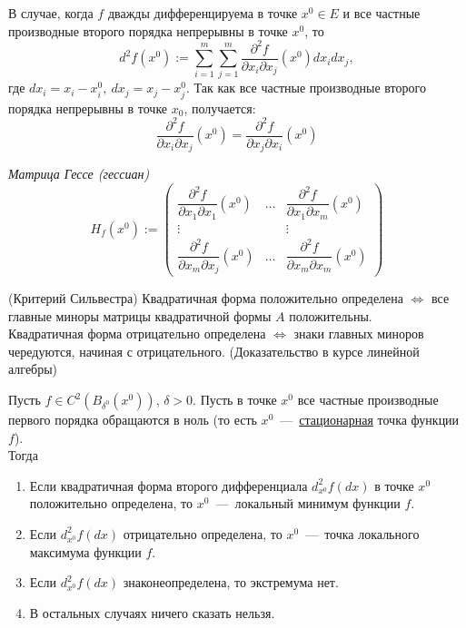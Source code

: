 В случае, когда $f$ дважды дифференцируема в точке $x^0 \in E$ и все частные производные второго порядка непрерывны в точке $x^0$, то 
$$ d^2f(x^0) := \sum\limits_{i=1}^m \sum\limits_{j=1}^m \dfrac{\partial^2 f}{\partial x_i \partial x_j} (x^0) dx_i dx_j, $$ где $dx_i = x_i - x_i^0, \ dx_j = x_j - x_j^0.$ Так как все частные производные второго порядка непрерывны в точке $x_0$, получается:
$$ \dfrac{\partial^2 f}{\partial x_i \partial x_j} (x^0) = \dfrac{\partial^2 f}{\partial x_j \partial x_i} (x^0) $$

\begin{definition}
    \textit{Матрица Гессе (гессиан)}
    $$H_f(x^0) := 
    \begin{pmatrix}
        \dfrac{\partial^2 f}{\partial x_1 \partial x_1} (x^0) & \dots & \dfrac{\partial^2 f}{\partial x_1 \partial x_m} (x^0) \\
        \vdots & & \vdots \\
        \dfrac{\partial^2 f}{\partial x_m \partial x_j} (x^0) & \dots & \dfrac{\partial^2 f}{\partial x_m \partial x_m} (x^0)
    \end{pmatrix}$$
\end{definition}

\begin{theorem}
   (Критерий Сильвестра) 
   Квадратичная форма положительно определена $\Longleftrightarrow$ все главные миноры матрицы квадратичной формы $A$ положительны. \\
   Квадратичная форма отрицательно определена $\Longleftrightarrow$ знаки главных миноров чередуются, начиная с отрицательного. (Доказательство в курсе линейной алгебры)
\end{theorem}

\begin{theorem}
    Пусть $f \in C^2\left( B_{\delta^0}(x^0)\right)$, $\delta > 0$. Пусть в точке $x^0$ все частные производные первого порядка обращаются в ноль (то есть $x^0$~---~\underline{стационарная} точка функции $f$). \\
    Тогда \begin{enumerate}
        \item  Если квадратичная форма второго дифференциала $d^2_{x^0} f(dx)$ в точке $x^0$ положительно определена, то $x^0$~---~локальный минимум функции $f$.
        \item Если $d^2_{x^0} f(dx)$ отрицательно определена, то $x^0$~---~точка локального максимума функции $f$.
        \item Если $d^2_{x^0} f(dx)$ знаконеопределена, то экстремума нет.
        \item В остальных случаях ничего сказать нельзя.
    \end{enumerate}
\end{theorem}

